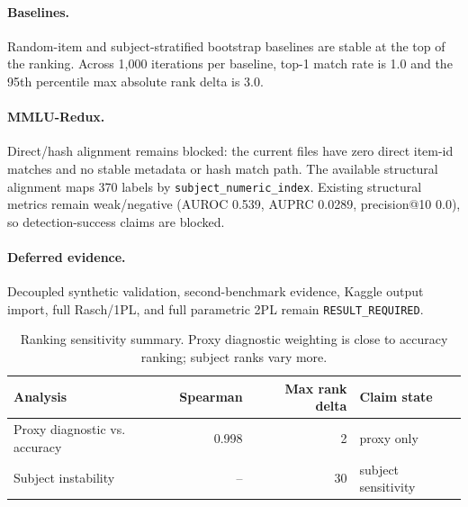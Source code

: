 \paragraph{Baselines.} Random-item and subject-stratified bootstrap baselines are stable at the top
of the ranking. Across 1,000 iterations per baseline, top-1 match rate is 1.0 and the 95th
percentile max absolute rank delta is 3.0.

\paragraph{MMLU-Redux.} Direct/hash alignment remains blocked: the current files have zero direct
item-id matches and no stable metadata or hash match path. The available structural alignment maps
370 labels by \texttt{subject\_numeric\_index}. Existing structural metrics remain weak/negative
(AUROC 0.539, AUPRC 0.0289, precision@10 0.0), so detection-success claims are blocked.

\paragraph{Deferred evidence.} Decoupled synthetic validation, second-benchmark evidence, Kaggle
output import, full Rasch/1PL, and full parametric 2PL remain \texttt{RESULT\_REQUIRED}.

\begin{table}[t]
  \centering
  \begin{tabular}{lrrl}
    \toprule
    Analysis & Spearman & Max rank delta & Claim state \\
    \midrule
    Proxy diagnostic vs. accuracy & 0.998 & 2 & proxy only \\
    Subject instability & -- & 30 & subject sensitivity \\
    \bottomrule
  \end{tabular}
  \caption{Ranking sensitivity summary. Proxy diagnostic weighting is close to accuracy ranking; subject ranks vary more.}
\end{table}
